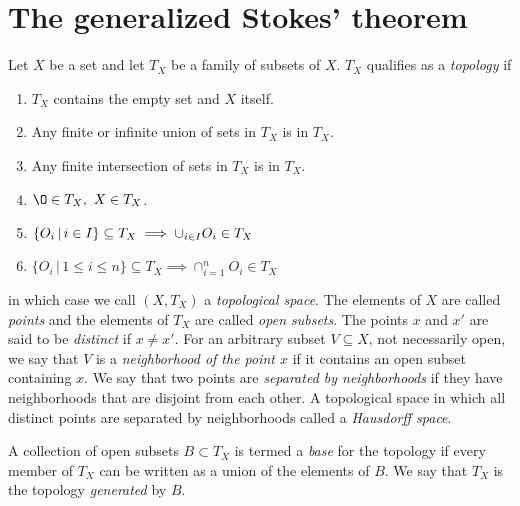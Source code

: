 \documentclass[11pt]{article}
\numberwithin{equation}{section}
\begin{document}
\newpage
\section{The generalized Stokes' theorem}

\begin{dfn}
Let $X$ be a set and let $T_X$ be a family of subsets of $X$.
$T_X$ qualifies as a \textit{topology} if
\begin{multicols}{2}%
\begin{enumerate}
\item
  $T_X$ contains the empty set and $X$ itself.
\item
  Any finite or infinite union of sets in $T_X$ is in $T_X$.
\item
  Any finite intersection of sets in $T_X$ is in $T_X$.
\setcounter{enumi}{0}
\item[]
  $\O\in T_X,\ X\in T_X$.
\item[]
  ${\displaystyle
    \{O_i\,|\,i\in I\}
  \subseteq
    T_X
  \implies
    \cup_{i\in I}
    O_i
  \in
    T_X
  }$
\item[]
  $
    \{O_i\,|\,1\leq i\leq n\}
  \subseteq
    T_X
  \implies
    \cap_{i=1}^n
    O_i
  \in
    T_X
  $
\end{enumerate}%
\end{multicols}%
\noindent
in which case we call $(X,T_X)$ a \textit{topological space}.
The elements of $X$ are called \textit{points} and the elements of $T_X$ are called \textit{open subsets}.
The points $x$ and $x'$ are said to be \textit{distinct} if $x\neq x'$.
For an arbitrary subset $V\subseteq X$, not necessarily open, we say that $V$ is a \textit{neighborhood of the point $x$} if it contains an open subset containing $x$.\footnotemark
{}
We say that two points are \textit{separated by neighborhoods} if they have neighborhoods that are disjoint from each other.
A topological space in which all distinct points are separated by neighborhoods called a \textit{Hausdorff space}.
\end{dfn}


\begin{dfn}
A collection of open subsets $B\subset T_X$ is termed a \textit{base} for the topology if every member of $T_X$ can be written as a union of the elements of $B$.
We say that $T_X$ is the topology \textit{generated} by $B$.
\end{dfn}
\end{document}

